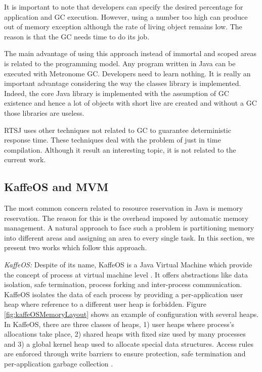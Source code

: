 It is important to note that developers can specify the desired percentage for application and GC execution.
However, using a number too high can produce out of memory exception although the rate of living object remains low. The reason is that the GC needs time to do its job.

The main advantage of using this approach instead of immortal and scoped areas is related to the programming model.
Any program written in Java can be executed with Metronome GC.
Developers need to learn nothing.
It is really an important advantage considering the way the classes library is implemented.
Indeed, the core Java library is implemented with the assumption of GC existence and hence a lot of objects with short live are created and without a GC those libraries are useless.

RTSJ uses other techniques not related to GC to guarantee deterministic response time. These techniques deal with the problem of just in time compilation. Although it result an interesting topic, it is not related to the current work. 


\subsection{KaffeOS and MVM}
The most common concern related to resource reservation in Java is memory reservation.
The reason for this is the overhead imposed by automatic memory management.
A natural approach to face such a problem is partitioning memory into different areas and assigning an area to every single task.
In this section, we present two works which follow this approach.

\emph{KaffeOS:} Despite of its name, KaffeOS is a Java Virtual Machine which provide the concept of process at virtual machine level \cite{back_processes_2000}.
It offers abstractions like data isolation, safe termination, process forking and inter-process communication.
KaffeOS isolates the data of each process by providing a per-application user heap where reference to a different user heap is forbidden.
Figure \ref{fig:kaffeOSMemoryLayout} shows an example of configuration with several heaps.
In KaffeOS, there are three classes of heaps, 1) user heaps where process's allocations take place, 2) shared heaps with fixed size used by many processes and 3) a global kernel heap used to allocate special data structures.
Access rules are enforced through write barriers to ensure protection, safe termination and per-application garbage collection \cite{back_processes_2000}.

